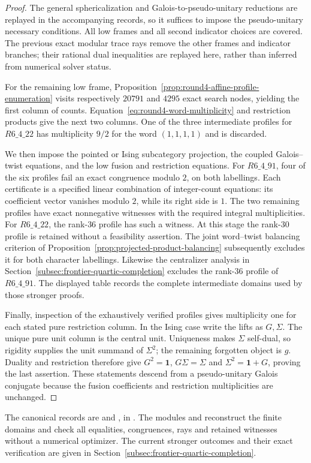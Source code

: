 \begin{proof}
The general sphericalization and Galois-to-pseudo-unitary reductions are
replayed in the accompanying records, so it suffices to impose the
pseudo-unitary necessary conditions.  All low frames and all second
indicator choices are covered.  The previous exact modular trace rays
remove the other frames and indicator branches; their rational dual
inequalities are replayed here, rather than inferred from numerical
solver status.

For the remaining low frame, Proposition~\ref{prop:round4-affine-profile-enumeration}
visits respectively $20791$ and $4295$ exact search nodes, yielding the
first column of counts.  Equation~\eqref{eq:round4-word-multiplicity} and
restriction products give the next two columns.  One of the three
intermediate profiles for $R6\_4\_22$ has multiplicity $9/2$ for the word
$(1,1,1,1)$ and is discarded.

We then impose the pointed or Ising subcategory projection, the coupled
Galois--twist equations, and the low fusion and restriction equations.
For $R6\_4\_91$, four of the six profiles fail an exact congruence modulo
$2$, on both labellings.  Each certificate is a specified linear
combination of integer-count equations: its coefficient vector vanishes
modulo $2$, while its right side is $1$.  The two remaining profiles have
exact nonnegative witnesses with the required integral multiplicities.
For $R6\_4\_22$, the rank-$36$ profile has such a witness. At this
stage the rank-$30$ profile is retained without a feasibility assertion.
The joint word--twist balancing criterion of
Proposition~\ref{prop:projected-product-balancing} subsequently excludes
it for both character labellings. Likewise the centralizer analysis in
Section~\ref{subsec:frontier-quartic-completion} excludes the rank-$36$
profile of $R6\_4\_91$. The displayed table records the complete
intermediate domains used by those stronger proofs.

Finally, inspection of the exhaustively verified profiles gives
multiplicity one for each stated pure restriction column.  In the Ising
case write the lifts as $G,\Sigma$.  The unique pure unit column is the
central unit.  Uniqueness makes $\Sigma$ self-dual, so rigidity supplies
the unit summand of $\Sigma^2$; the remaining forgotten object is $g$.
Duality and restriction therefore give
$G^2=\mathbf1$, $G\Sigma=\Sigma$ and
$\Sigma^2=\mathbf1+G$, proving the last assertion.  These statements descend
from a pseudo-unitary Galois conjugate because the fusion coefficients and
restriction multiplicities are unchanged.
\end{proof}

The canonical records are
 and
, in
.  The modules
 and
 reconstruct the finite domains and check
all equalities, congruences, rays and retained witnesses without a
numerical optimizer.  The current stronger outcomes and their exact verification are given in
Section~\ref{subsec:frontier-quartic-completion}.
